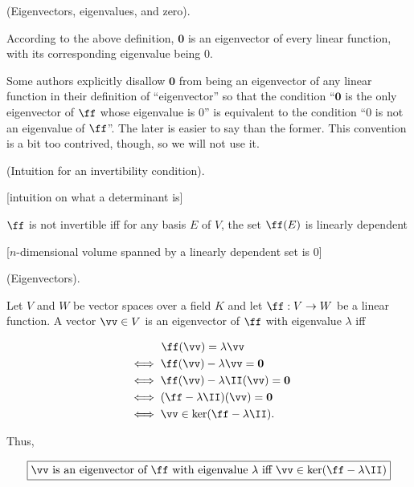\begin{remark}
    (Eigenvectors, eigenvalues, and zero).
    
    According to the above definition, $\mathbf{0}$ is an eigenvector of every linear function, with its corresponding eigenvalue being $0$. 
    
    Some authors explicitly disallow $\mathbf{0}$ from being an eigenvector of any linear function in their definition of ``eigenvector'' so that the condition ``$\mathbf{0}$ is the only eigenvector of $\ff$ whose eigenvalue is $0$'' is equivalent to the condition ``$0$ is not an eigenvalue of $\ff$''. The later is easier to say than the former. This convention is a bit too contrived, though, so we will not use it.
\end{remark}

\begin{theorem}
    (Intuition for an invertibility condition).
    
    [intuition on what a determinant is]
    
    $\ff$ is not invertible iff for any basis $E$ of $V$, the set $\ff(E)$ is linearly dependent

    [$n$-dimensional volume spanned by a linearly dependent set is $0$]
\end{theorem}

\begin{deriv}
    (Eigenvectors).

     Let $V$ and $W$ be vector spaces over a field $K$ and let $\ff:V \rightarrow W$ be a linear function. A vector $\vv \in V$ is an eigenvector of $\ff$ with eigenvalue $\lambda$ iff

    \begin{align*}
        &\quad \quad \quad \ff(\vv) = \lambda \vv \\
        &\iff \ff(\vv) - \lambda \vv = \mathbf{0} \\
        &\iff \ff(\vv) - \lambda \II(\vv) = \mathbf{0} \\
        &\iff (\ff - \lambda \II)(\vv) = \mathbf{0} \\
        &\iff \vv \in \ker(\ff - \lambda \II).
    \end{align*}

    Thus,

    \begin{align*}
        \boxed
        {
            \text{$\vv$ is an eigenvector of $\ff$ with eigenvalue $\lambda$ iff $\vv \in \ker(\ff - \lambda \II)$}
        }
    \end{align*}
\end{deriv}

